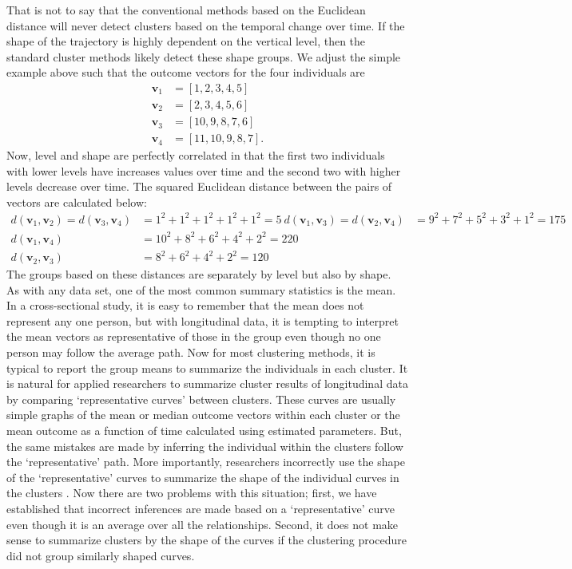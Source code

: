 \documentclass[12pt]{article}
\newcommand{\B}[0]{\mathbf}
\begin{document}
That is not to say that the conventional methods based on the Euclidean distance will never detect clusters based on the temporal change over time. If the shape of the trajectory is highly dependent on the vertical level, then the standard cluster methods likely detect these shape groups. We adjust the simple example above such that the outcome vectors for the four individuals are
\begin{align*}
\B v_{1}&=[1,2,3,4,5]\\
\B v_{2}&=[2,3,4,5,6]\\
\B v_{3}&=[10,9,8,7,6]\\
\B v_{4}&=[11,10,9,8,7].
\end{align*}
Now, level and shape are perfectly correlated in that the first two individuals with lower levels have increases values over time and the second two with higher levels decrease over time. The squared Euclidean distance between the pairs of vectors are calculated below:
\begin{align*}
d(\B v_{1},\B v_{2}) = d(\B v_{3},\B v_{4}) &= 1^{2}+1^{2}+1^{2}+1^{2} + 1^{2} = 5\
d(\B v_{1},\B v_{3}) = d(\B v_{2},\B v_{4}) &= 9^{2}+7^{2}+5^{2}+3^{2}+1^{2}=175\\
d(\B v_{1},\B v_{4}) &= 10^{2}+8^{2}+6^{2}+4^{2}+2^{2}=220\\
d(\B v_{2},\B v_{3}) &= 8^{2}+6^{2}+4^{2}+2^{2}=120
\end{align*}
The groups based on these distances are separately by level but also by shape. \\

As with any data set, one of the most common summary statistics is the mean. In a cross-sectional study, it is easy to remember that the mean does not represent any one person, but with longitudinal data, it is tempting to interpret the mean vectors as representative of those in the group even though no one person may follow the average path. Now for most clustering methods, it is typical to report the group means to summarize the individuals in each cluster. It is natural for applied researchers to summarize cluster results of longitudinal data by comparing `representative curves' between clusters. These curves are usually simple graphs of the mean or median outcome vectors within each cluster or the mean outcome as a function of time calculated using estimated parameters. But, the same mistakes are made by inferring the individual within the clusters follow the `representative' path. More importantly, researchers incorrectly use the shape of the `representative' curves to summarize the shape of the individual curves in the clusters \cite{windle2004,mulvaney2006,broadbent2008,pryor2011,mccoy2010}. Now there are two problems with this situation; first, we have established that incorrect inferences are made based on a `representative' curve  even though it is an average over all the relationships. Second, it does not make sense to summarize clusters by the shape of the curves if the clustering procedure did not group similarly shaped curves. \\
\end{document}

